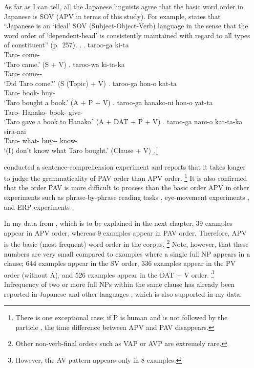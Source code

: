 As far as I can tell,
all the Japanese linguists agree that
the basic word order in Japanese is SOV (APV in terms of this study).
For example,
 states that
``Japanese is an `ideal' SOV (Subject-Object-Verb) language
in the sense that the word order of `dependent-head' is consistently maintained with regard to all types of constituent'' (p.~257).
%
\ex.
 \ag. taroo-ga ki-ta \\
      Taro- come- \\
      `Taro came.' \hfill{(S + V)}
 \bg. taroo-wa ki-ta-ka \\
      Taro- come-- \\
      `Did Taro come?'  \hfill{(S (Topic) + V)}
 \bg. taroo-ga hon-o kat-ta \\
      Taro- book- buy- \\
      `Taro bought a book.' \hfill{(A + P + V)}
 \bg. taroo-ga hanako-ni hon-o yat-ta \\
      Taro- Hanako- book- give- \\
      `Taro gave a book to Hanako.' \hfill{(A + DAT + P + V)}
 \bg. taroo-ga nani-o kat-ta-ka sira-nai \\
      Taro- what- buy-- know- \\
      `(I) don't know what Taro bought.'  \hfill{(Clause + V)}
 \b.[]     \hfill{\cite[257--258]{shibatani90}}


 conducted a sentence-comprehension experiment and
reports that it takes longer to judge the grammaticality of PAV order than APV order.%
 \footnote{
 There is one exceptional case;
 if P is human and is not followed by the particle ,
 the time difference between APV and PAV disappears.
 }
It is also confirmed that
the order PAV is more difficult to process than the basic order APV
in other experiments such as
phrase-by-phrase reading tasks \cite{miyamototakahashi02},
eye-movement experiments \cite{mazukaetal02}, and
ERP experiments \cite{uenokluender03}.

In my data from ,
which is to be explained in the next chapter,
39 examples appear in APV order,
whereas 9 examples appear in PAV order.
Therefore, APV is the basic (most frequent) word order in the corpus.%
 \footnote{
 Other non-verb-final orders such as VAP or AVP are extremely rare.
 }
Note, however, that
these numbers are very small compared to
examples where a single full NP appears in a clause;
644 examples appear in the SV order,
336 examples appear in the PV order (without A), and
526 examples appear in the DAT + V order.%
 \footnote{
 However, the AV pattern appears only in 8 examples.
 }
Infrequency of two or more full NPs within the same clause
has already been reported in Japanese \cite{matsumoto03} and other languages \cite{dubois87,dryer97},
which is also supported in my data.


